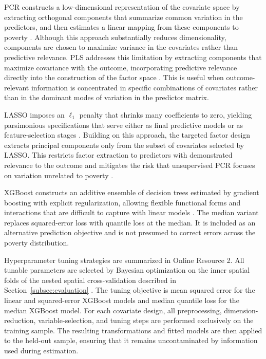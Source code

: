 \documentclass[pdflatex,sn-apa]{sn-jnl}
\begin{document}
PCR constructs a low-dimensional representation of the covariate space by extracting orthogonal components that summarize common variation in the predictors, and then estimates a linear mapping from these components to poverty \citep{Hastie2009}. Although this approach substantially reduces dimensionality, components are chosen to maximize variance in the covariates rather than predictive relevance. PLS addresses this limitation by extracting components that maximize covariance with the outcome, incorporating predictive relevance directly into the construction of the factor space \citep{WOLD1973, Hastie2009}. This is useful when outcome-relevant information is concentrated in specific combinations of covariates rather than in the dominant modes of variation in the predictor matrix.

LASSO imposes an $\ell_1$ penalty that shrinks many coefficients to zero, yielding parsimonious specifications that serve either as final predictive models or as feature-selection stages \citep{Tibshirani1996}. Building on this approach, the targeted factor design extracts principal components only from the subset of covariates selected by LASSO. This restricts factor extraction to predictors with demonstrated relevance to the outcome and mitigates the risk that unsupervised PCR focuses on variation unrelated to poverty \citep{bai2008forecasting, Bair2006}.

XGBoost constructs an additive ensemble of decision trees estimated by gradient boosting with explicit regularization, allowing flexible functional forms and interactions that are difficult to capture with linear models \citep{chen2016xgboost}. The median variant replaces squared-error loss with quantile loss at the median. It is included as an alternative prediction objective and is not presumed to correct errors across the poverty distribution.

Hyperparameter tuning strategies are summarized in Online Resource 2. All tunable parameters are selected by Bayesian optimization on the inner spatial folds of the nested spatial cross-validation described in Section~\ref{subsec:evaluation} \citep{Bergstra2011}. The tuning objective is mean squared error for the linear and squared-error XGBoost models and median quantile loss for the median XGBoost model. For each covariate design, all preprocessing, dimension-reduction, variable-selection, and tuning steps are performed exclusively on the training sample. The resulting transformations and fitted models are then applied to the held-out sample, ensuring that it remains uncontaminated by information used during estimation.
\end{document}
